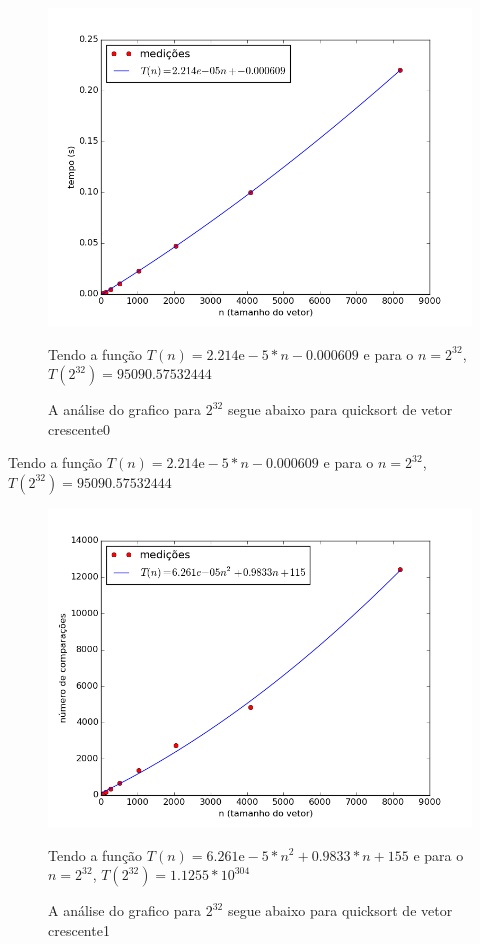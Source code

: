 \documentclass[12pt,a4paper,twoside]{report}
\begin{document}


\begin{figure}[ht]
\centering \includegraphics[scale=0.8]{../quicksort/imagens/quicksortCrescente0.png}
\caption{A análise do grafico para $2^{32}$ segue abaixo para quicksort de vetor crescente0}
Tendo a função $T(n) = 2.214\mathrm{e}-5*n-0.000609$ e para o $n =2^{32}$, $T(2^{32}) =  95090.57532444$ 
\label{fig:quicksortCrescente0}
\end{figure}

Tendo a função $T(n) = 2.214\mathrm{e}-5*n-0.000609$ e para o $n =2^{32}$, $T(2^{32}) = 95090.57532444$ 

\begin{figure}[ht]
\centering \includegraphics[scale=0.8]{../quicksort/imagens/quicksortCrescente1.png}
\caption{A análise do grafico para $2^{32}$ segue abaixo para quicksort de vetor crescente1}
Tendo a função $T(n) = 6.261\mathrm{e}-5*n^2+0.9833*n+155$ e para o $n =2^{32}$, $T(2^{32}) = 1.1255 * 10^{304}$ 

\label{fig:quicksortCrescente1}
\end{figure}
\end{document}
